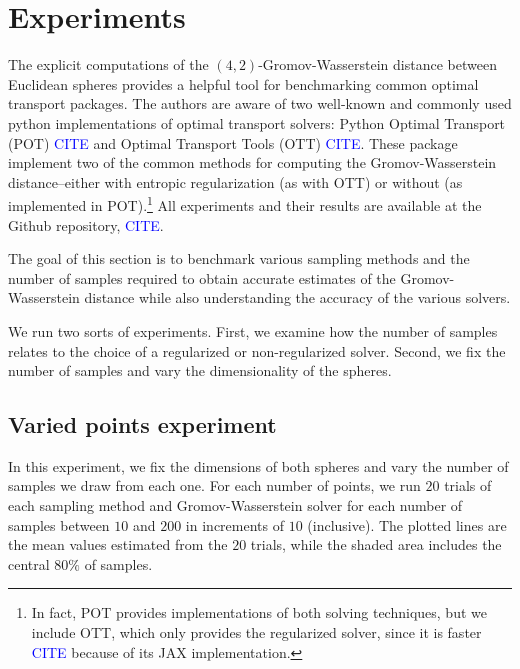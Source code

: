 \documentclass{article}
\begin{document}
\section{Experiments}
The explicit computations of the $(4, 2)$-Gromov-Wasserstein distance between
Euclidean spheres provides a helpful tool for benchmarking common optimal
transport packages. The authors are aware of two well-known and commonly used
python implementations of optimal transport solvers: Python Optimal Transport
(POT) \textcolor{blue}{CITE} and Optimal Transport Tools (OTT)
\textcolor{blue}{CITE}. These package implement two of the common methods for
computing the Gromov-Wasserstein distance--either with entropic regularization
(as with OTT) or without (as implemented in POT).\footnote{In fact, POT
provides implementations of both solving techniques, but we include OTT, which
only provides the regularized solver, since it is faster \textcolor{blue}{CITE}
because of its JAX implementation.} All experiments and their results are
available at the Github repository, \textcolor{blue}{CITE}.

The goal of this section is to benchmark various sampling methods and the
number of samples required to obtain accurate estimates of the
Gromov-Wasserstein distance while also understanding the accuracy of the
various solvers.

We run two sorts of experiments. First, we examine how the number of
samples relates to the choice of a regularized or non-regularized solver.
Second, we fix the number of samples and vary the dimensionality of the
spheres.

\subsection{Varied points experiment}

In this experiment, we fix the dimensions of both spheres and vary the number
of samples we draw from each one. For each number of points, we run $20$ trials
of each sampling method and Gromov-Wasserstein solver for each number of
samples between $10$ and $200$ in increments of $10$ (inclusive). The plotted
lines are the mean values estimated from the $20$ trials, while the shaded area
includes the central $80\%$ of samples.
\end{document}
